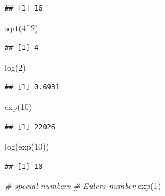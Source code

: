 \documentclass[
  12pt,
]{style/krantz}
\newenvironment{Shaded}{\begin{snugshade}}{\end{snugshade}}
\newcommand{\CommentTok}[1]{\textcolor[rgb]{0.56,0.35,0.01}{\textit{#1}}}
\newcommand{\DecValTok}[1]{\textcolor[rgb]{0.00,0.00,0.81}{#1}}
\newcommand{\FunctionTok}[1]{\textcolor[rgb]{0.00,0.00,0.00}{#1}}
\newcommand{\NormalTok}[1]{#1}
\newcommand{\SpecialCharTok}[1]{\textcolor[rgb]{0.00,0.00,0.00}{#1}}
\begin{document}
\begin{verbatim}
## [1] 16
\end{verbatim}

\begin{Shaded}
\begin{Highlighting}[]
\FunctionTok{sqrt}\NormalTok{(}\DecValTok{4}\SpecialCharTok{\^{}}\DecValTok{2}\NormalTok{)}
\end{Highlighting}
\end{Shaded}

\begin{verbatim}
## [1] 4
\end{verbatim}

\begin{Shaded}
\begin{Highlighting}[]
\FunctionTok{log}\NormalTok{(}\DecValTok{2}\NormalTok{)}
\end{Highlighting}
\end{Shaded}

\begin{verbatim}
## [1] 0.6931
\end{verbatim}

\begin{Shaded}
\begin{Highlighting}[]
\FunctionTok{exp}\NormalTok{(}\DecValTok{10}\NormalTok{)}
\end{Highlighting}
\end{Shaded}

\begin{verbatim}
## [1] 22026
\end{verbatim}

\begin{Shaded}
\begin{Highlighting}[]
\FunctionTok{log}\NormalTok{(}\FunctionTok{exp}\NormalTok{(}\DecValTok{10}\NormalTok{))}
\end{Highlighting}
\end{Shaded}

\begin{verbatim}
## [1] 10
\end{verbatim}

\begin{Shaded}
\begin{Highlighting}[]
\CommentTok{\# special numbers}
\CommentTok{\# Euler\textquotesingle{}s number}
\FunctionTok{exp}\NormalTok{(}\DecValTok{1}\NormalTok{)}
\end{Highlighting}
\end{Shaded}
\end{document}
